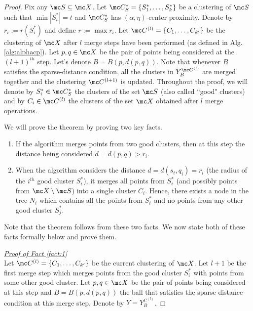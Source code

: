 \documentclass[11pt]{article}
\begin{document}
\begin{proof}
Fix any $\mc S \subseteq \mc X$. Let $\mc C^*_S = \{S_1^*, \ldots, S_k^*\}$ be a clustering of $\mc S$ such that $\min |S_i^*| = t$ and $\mc C^*_S$ has $(\alpha, \eta)$-center proximity. Denote by $r_i := r(S_i^*)$ and define $r := \max r_i$. Let $\mc C^{(l)} = \{C_1, \ldots, C_{k'}\}$ be the clustering of $\mc X$ after $l$ merge steps have been performed (as defined in Alg.\ref{alg:alphacp}). Let $p, q \in \mc X$ be the pair of points being considered at the $(l+1)^{th}$ step. Let's denote $B = B(p, d(p, q))$. Note that whenever $B$ satisfies the sparse-distance condition, all the clusters in $Y_{B}^{{\mc C}^{(l)}}$ are merged together and the clustering $\mc C^{(l+1)}$ is updated. Throughout the proof, we will denote by $S_i^* \in \mc C^*_S$ the clusters of the set $\mc S$ (also called ``good" clusters) and by $C_i \in \mc C^{(l)}$ the clusters of the set $\mc X$ obtained after $l$ merge operations.

\noindent We will prove the theorem by proving two key facts. %

\begin{enumerate}[nolistsep, noitemsep, label=\textbf{F.\arabic*}]
\renewcommand\labelitemi{$\diamond$}
\item \label{fact:1} If the algorithm merges points from two good clusters, then at this step the distance being considered $d = d(p,q) > r_i$.	
\item \label{fact:2} When the algorithm considers the distance $d = d(s_i, q_i) = r_i$ (the radius of the $i^{th}$ good cluster $S_i^*$), it merges all points from $S_i^*$ (and possibly points from $\mc X\setminus \mc S$) into a single cluster $C_i$. Hence, there exists a node in the tree $N_i$ which contains all the points from $S_i^*$ and no points from any other good cluster $S_j^*$. 	
\end{enumerate}
Note that the theorem follows from these two facts. We now state both of these facts formally below and prove them.

\noindent\textit{\underline{Proof of Fact \ref{fact:1} %
}}\\
Let $\mc C^{(l)} = \{C_1, \ldots, C_{k'}\}$ be the current clustering of $\mc X$. Let $l+1$ be the first merge step which merges points from the good cluster $S_i^*$ with points from some other good cluster. Let $p, q \in \mc X$ be the pair of points being considered at this step and $B = B(p, d(p, q))$ the ball that satisfies the sparse distance condition at this merge step. Denote by $Y = Y_{B}^{C^{(l)}}$.


\end{proof}
\end{document}
